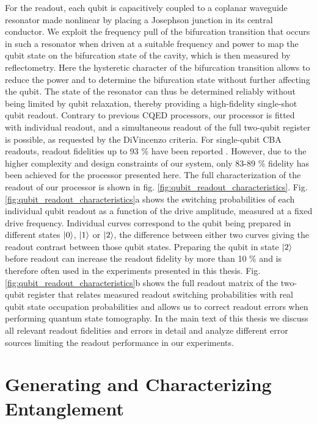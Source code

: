 For the readout, each qubit is capacitively coupled   to a coplanar waveguide resonator made  nonlinear by placing a Josephson junction in its central conductor. We exploit the frequency pull of the bifurcation transition that occurs in such a resonator when driven at a suitable frequency and power to map the qubit state on the bifurcation state of the cavity, which is then measured by reflectometry. Here the hysteretic character of the bifurcation transition allows to reduce the power and to determine the bifurcation state without further affecting the qubit.  The state of the resonator can thus be determined reliably  without being limited by qubit relaxation, thereby providing a high-fidelity  single-shot qubit readout. Contrary to previous CQED processors, our processor is fitted   with   individual readout, and a simultaneous readout of the full two-qubit register is possible, as requested by the  DiVincenzo criteria. For single-qubit CBA readouts, readout fidelities up to 93 \% have been reported \citep{mallet_single-shot_2009}. However, due to the higher complexity and design constraints of our system, only  83-89 \% fidelity has been achieved for the processor presented here. The full characterization of the readout of our processor is shown in fig. \ref{fig:qubit_readout_characteristics}. Fig. \ref{fig:qubit_readout_characteristics}a shows the switching probabilities of each individual qubit readout as a function of the drive amplitude, measured at a fixed drive frequency. Individual curves correspond to the qubit being prepared in different states $\left| 0 \right>$, $\left| 1 \right>$ or $\left| 2 \right>$, the difference between either two curves giving the readout contrast between those qubit states. Preparing the qubit in state $\left| 2 \right>$ before readout can increase the readout fidelity by more than 10 \% and is therefore often used in the experiments presented in this thesis. Fig. \ref{fig:qubit_readout_characteristics}b shows the full readout matrix of the two-qubit register that relates measured readout switching probabilities with real qubit state occupation probabilities and allows us to correct readout errors when performing quantum state tomography. In the main text of this thesis we discuss all relevant readout fidelities and errors in detail and analyze different error sources limiting the readout performance in our experiments.

\section{Generating and Characterizing Entanglement}

